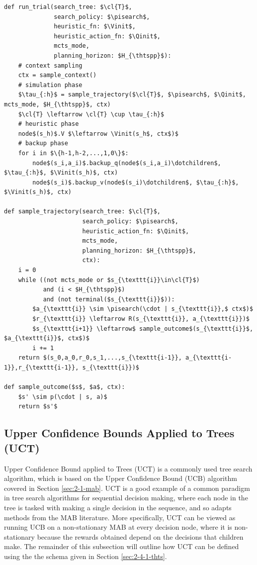         
        \begin{Listing}
            \begin{lstlisting}
def run_trial(search_tree: $\cl{T}$, 
              search_policy: $\pisearch$, 
              heuristic_fn: $\Vinit$,
              heuristic_action_fn: $\Qinit$,
              mcts_mode,
              planning_horizon: $H_{\thtspp}$):
    # context sampling
    ctx = sample_context()
    # simulation phase
    $\tau_{:h}$ = sample_trajectory($\cl{T}$, $\pisearch$, $\Qinit$, mcts_mode, $H_{\thtspp}$, ctx)
    $\cl{T} \leftarrow \cl{T} \cup \tau_{:h}$
    # heuristic phase
    node$(s_h)$.V $\leftarrow \Vinit(s_h$, ctx$)$
    # backup phase
    for i in $\{h-1,h-2,...,1,0\}$:
        node$(s_i,a_i)$.backup_q(node$(s_i,a_i)\dotchildren$, $\tau_{:h}$, $\Vinit(s_h)$, ctx)
        node$(s_i)$.backup_v(node$(s_i)\dotchildren$, $\tau_{:h}$, $\Vinit(s_h)$, ctx)

def sample_trajectory(search_tree: $\cl{T}$, 
                      search_policy: $\pisearch$, 
                      heuristic_action_fn: $\Qinit$,
                      mcts_mode,
                      planning_horizon: $H_{\thtspp}$,
                      ctx):
    i = 0
    while ((not mcts_mode or $s_{\texttt{i}}\in\cl{T}$) 
           and (i < $H_{\thtspp}$) 
           and (not terminal($s_{\texttt{i}}$)):
        $a_{\texttt{i}} \sim \pisearch(\cdot | s_{\texttt{i}},$ ctx$)$ 
        $r_{\texttt{i}} \leftarrow R(s_{\texttt{i}}, a_{\texttt{i}})$
        $s_{\texttt{i+1}} \leftarrow$ sample_outcome$(s_{\texttt{i}}$, $a_{\texttt{i}}$, ctx$)$
        i += 1
    return $(s_0,a_0,r_0,s_1,...,s_{\texttt{i-1}}, a_{\texttt{i-1}},r_{\texttt{i-1}}, s_{\texttt{i}})$

def sample_outcome($s$, $a$, ctx):
    $s' \sim p(\cdot | s, a)$
    return $s'$
            \end{lstlisting}
            \caption{Psuedocode for running a trial in \thtspp.}
            \label{lst:2:thts_trial}
        \end{Listing}


    



    
    \subsection{Upper Confidence Bounds Applied to Trees (UCT)}
    \label{sec:2-4-2-uct}

        Upper Confidence Bound applied to Trees (UCT) \cite{uct,uct_long} is a commonly used tree search algorithm, which is based on the Upper Confidence Bound (UCB) algorithm covered in Section \ref{sec:2-1-mab}. UCT is a good example of a common paradigm in tree search algorithms for sequential decision making, where each node in the tree is tasked with making a single decision in the sequence, and so adapts methods from the MAB literature. More specifically, UCT can be viewed as running UCB on a non-stationary MAB at every decision node, where it is non-stationary because the rewards obtained depend on the decisions that children make. The remainder of this subsection will outline how UCT can be defined using the the \thtspp\ewe schema given in Section \ref{sec:2-4-1-thts}.

